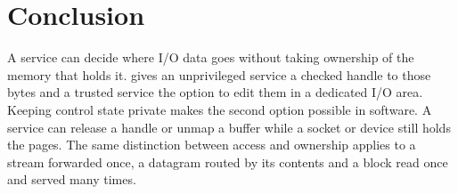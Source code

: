 \section{Conclusion}
\label{sec:conclusion}

A service can decide where I/O data goes without taking ownership of the
memory that holds it. \sys gives an unprivileged service a checked handle to
those bytes and a trusted service the option to edit them in a dedicated I/O
area. Keeping control state private makes the second option possible in
software. A service can release a handle or unmap a buffer while a socket or
device still holds the pages. The same distinction
between access and ownership applies to a stream forwarded once, a datagram
routed by its contents and a block read once and served many times.
\label{body:end}
